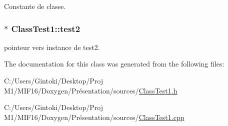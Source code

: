 Constante de classe. 

\hypertarget{class_class_test1_a41927c2bf56ea6d6f79b945db9095c9b}{
\subsubsection[{test2}]{$\ast$ {\bf ClassTest1::test2}}}
\label{class_class_test1_a41927c2bf56ea6d6f79b945db9095c9b}


pointeur vers instance de test2. 



The documentation for this class was generated from the following files:\begin{DoxyCompactItemize}
\item 
C:/Users/Gintoki/Desktop/Proj M1/MIF16/Doxygen/Présentation/sources/\hyperlink{_class_test1_8h}{ClassTest1.h}\item 
C:/Users/Gintoki/Desktop/Proj M1/MIF16/Doxygen/Présentation/sources/\hyperlink{_class_test1_8cpp}{ClassTest1.cpp}\end{DoxyCompactItemize}
